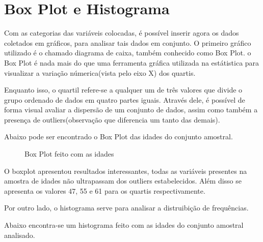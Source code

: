 \chapter{Box Plot e Histograma}

    \setcounter{section}{0}

    Com as categorias das variáveis colocadas, é possível inserir agora os dados coletados em gráficos, para 
    analisar tais dados em conjunto. O primeiro gráfico utilizado é o chamado diagrama de caixa, também conhecido
    como Box Plot. o Box Plot é nada mais do que uma ferramenta gráfica utilizada na estátistica para visualizar 
    a variação númerica(vista pelo eixo X) dos quartis.

    Enquanto isso, o quartil refere-se a qualquer um de três valores que divide o grupo ordenado de dados em quatro partes 
    iguais. Através dele, é possível de forma visual avaliar a dispersão de um conjunto de dados, assim como também a presença 
    de outliers(observação que diferencia um tanto das demais).

    Abaixo pode ser encontrado o Box Plot das idades do conjunto amostral.

    \begin{figure}[H]
      \centering
      \caption{Box Plot feito com as idades}
    \end{figure}

    O boxplot apresentou resultados interessantes, todas as variáveis presentes na 
    amostra de idades não ultrapassam dos outliers estabelecidos. Além disso se 
    apresenta os valores 47, 55 e 61 para os quartis respectivamente.  
    
    Por outro lado, o histograma serve para analisar a distruibição de frequências.

    Abaixo encontra-se um histograma feito com as idades do conjunto amostral analisado.

